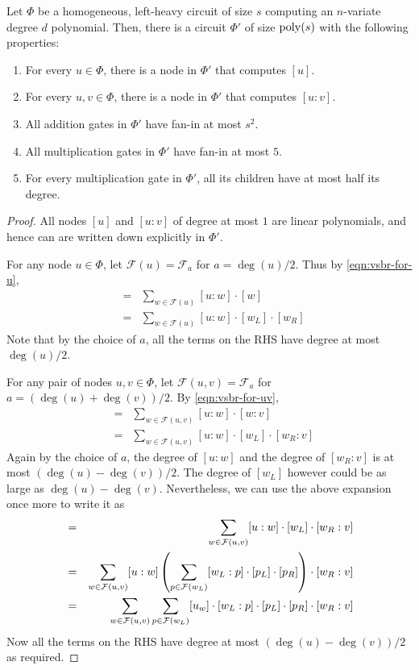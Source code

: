 \begin{theorem}
Let $\Phi$ be a homogeneous, left-heavy circuit of size $s$ computing an $n$-variate degree $d$ polynomial. Then, there is a circuit $\Phi'$ of size $\mathrm{poly}(s)$ with the following properties:
\begin{enumerate}
\item For every $u\in \Phi$, there is a node in $\Phi'$ that computes $[u]$.
\item For every $u,v\in \Phi$, there is a node in $\Phi'$ that computes $[u:v]$. 
\item All addition gates in $\Phi'$ have fan-in at most $s^2$. 
\item All multiplication gates in $\Phi'$ have fan-in at most $5$. 
\item For every multiplication gate in $\Phi'$, all its children have at most half its degree. 
\end{enumerate}
\end{theorem}
\begin{proof}
All nodes $[u]$ and $[u:v]$ of degree at most $1$ are linear polynomials, and hence can are written down explicitly in $\Phi'$. 

For any node $u\in \Phi$, let $\mathcal{F}(u) = \mathcal{F}_a$ for $a = \deg(u)/2$. Thus by \eqref{eqn:vsbr-for-u},
\begin{eqnarray*}
[u] & = & \sum_{w\in \mathcal{F}(u)} [u:w] \cdot [w]\\ 
    & = & \sum_{w\in \mathcal{F}(u)} [u:w] \cdot [w_L] \cdot [w_R]
\end{eqnarray*}
Note that by the choice of $a$, all the terms on the RHS have degree at most $\deg(u)/2$. 

For any pair of nodes $u,v\in \Phi$, let $\mathcal{F}(u,v) = \mathcal{F}_a$ for $a = (\deg(u) + \deg(v))/2$. By \eqref{eqn:vsbr-for-uv},
\begin{eqnarray*}
[u:v] & = & \sum_{w\in \mathcal{F}(u,v)} [u:w] \cdot [w:v]\\ 
    & = & \sum_{w\in \mathcal{F}(u,v)} [u:w] \cdot [w_L] \cdot [w_R:v]
\end{eqnarray*}
Again by the choice of $a$, the degree of $[u:w]$ and the degree of $[w_R:v]$ is at most $(\deg(u) - \deg(v))/2$. The degree of $[w_L]$ however could be as large as $\deg(u) - \deg(v)$. Nevertheless, we can use the above expansion once more to write it as
\begin{eqnarray*}
  [u:v] & = & \sum_{w\in \mathcal{F}(u,v)} [u:w] \cdot [w_L] \cdot [w_R:v]\\
        & = & \sum_{w\in \mathcal{F}(u,v)} [u:w] \inparen{\sum_{p \in \mathcal{F}(w_L)} [w_L:p] \cdot [p_L] \cdot [p_R]}\cdot [w_R:v]\\
        & = & \sum_{w\in \mathcal{F}(u,v)}\sum_{p\in \mathcal{F}(w_L)} [u_w] \cdot  [w_L:p] \cdot [p_L] \cdot [p_R]\cdot [w_R:v]
\end{eqnarray*}
Now all the terms on the RHS have degree at most $(\deg(u) - \deg(v))/2$ as required. 
\end{proof}

